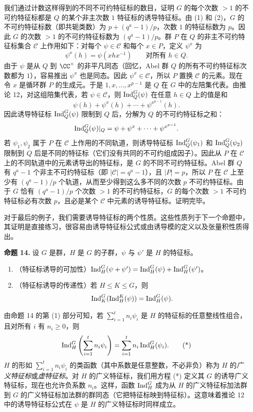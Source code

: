 我们通过计数这样得到的不同不可约特征标的数目，证明 $G$ 的每个次数 $>1$ 的不可约特征标都是 $Q$ 的某个非主次数 $1$ 特征标的诱导特征标。由 (1) 和 (2)，$G$ 的不可约特征标数（即共轭类数）为 $p+(q^a-1)/p$，次数 $1$ 的特征标数为 $p$。因此 $G$ 的次数 $>1$ 的不可约特征标数为 $(q^a-1)/p$。群 $P$ 在 $Q$ 的非主不可约特征标集合 $\mathcal C$ 上作用如下：对每个 $\psi\in\mathcal C$ 和每个 $x\in P$，定义 $\psi^x$ 为
\[
  \psi^x(h)=\psi(xhx^{-1})\qquad\text{对所有 }h\in Q.
\]
由于 $\psi$ 是从 $Q$ 到 $\CC^\times$ 的非平凡同态（回忆，Abel 群 $Q$ 的所有不可约特征标次数都为 $1$），容易推出 $\psi^x$ 也是同态。因此 $\psi^x\in\mathcal C$，所以 $P$ 置换 $\mathcal C$ 的元素。现在令 $x$ 是循环群 $P$ 的生成元。于是 $1,x,\ldots,x^{p-1}$ 是 $Q$ 在 $G$ 中的左陪集代表。由推论 12，对这组陪集代表，若 $\psi\in\mathcal C$，则 $\operatorname{Ind}_Q^G(\psi)$ 在任意 $h\in Q$ 上的值是和
\[
  \psi(h)+\psi^x(h)+\cdots+\psi^{x^{p-1}}(h).
\]
因此诱导特征标 $\operatorname{Ind}_Q^G(\psi)$ 限制到 $Q$ 后，分解为 $Q$ 的不可约特征标之和：
\[
  \operatorname{Ind}_Q^G(\psi)|_Q=\psi+\psi^x+\cdots+\psi^{x^{p-1}}.
\]
若 $\psi_1,\psi_2$ 属于 $P$ 在 $\mathcal C$ 上作用的不同轨道，则诱导特征标 $\operatorname{Ind}_Q^G(\psi_1)$ 和 $\operatorname{Ind}_Q^G(\psi_2)$ 限制到 $Q$ 后是不同的特征标（它们没有共同的不可约组成因子）。因此从 $P$ 在 $\mathcal C$ 上的不同轨道中的元素诱导出的特征标，是 $G$ 的不同不可约特征标。Abel 群 $Q$ 有 $q^a-1$ 个非主不可约特征标（即 $|\mathcal C|=q^a-1$），且 $|P|=p$，所以 $P$ 在 $\mathcal C$ 上至少有 $(q^a-1)/p$ 个轨道，从而至少得到这么多不同的次数 $p$ 不可约特征标。由于 $G$ 恰有 $(q^a-1)/p$ 个次数 $>1$ 的不可约特征标，$G$ 的每个次数 $>1$ 不可约特征标必有次数 $p$，且必是某个 $\mathcal C$ 中元素的诱导特征标。证明完毕。

对于最后的例子，我们需要诱导特征标的两个性质。这些性质列于下一个命题中，其证明是直接练习，很容易由诱导特征标公式或由诱导模的定义以及张量积性质得出。

\noindent\textbf{命题 14.} 设 $G$ 是群，$H$ 是 $G$ 的子群，$\psi$ 与 $\psi'$ 是 $H$ 的特征标。
\begin{enumerate}[label=(\arabic*)]
  \item （特征标诱导的可加性）$\operatorname{Ind}_H^G(\psi+\psi')=\operatorname{Ind}_H^G(\psi)+\operatorname{Ind}_H^G(\psi')$。
  \item （特征标诱导的传递性）若 $H\leq K\leq G$，则
  \[
    \operatorname{Ind}_K^G(\operatorname{Ind}_H^K(\psi))=\operatorname{Ind}_H^G(\psi).
  \]
\end{enumerate}

由命题 14 的第 (1) 部分可知，若 $\sum_{i=1}^t n_i\psi_i$ 是 $H$ 的特征标的任意整线性组合，且对所有 $i$ 有 $n_i\geq0$，则
\[
  \operatorname{Ind}_H^G\left(\sum_{i=1}^t n_i\psi_i\right)
  =\sum_{i=1}^t n_i\operatorname{Ind}_H^G(\psi_i). \tag{*}
\]
$H$ 的形如 $\sum_{i=1}^t n_i\psi_i$ 的类函数（其中系数是任意整数，不必非负）称为 $H$ 的\emph{广义特征标}或\emph{虚特征标}。对 $H$ 的广义特征标，我们用方程 (*) 定义其 $G$ 的诱导广义特征标，现在也允许负系数 $n_i$。这样，函数 $\operatorname{Ind}_H^G$ 成为从 $H$ 的广义特征标加法群到 $G$ 的广义特征标加法群的群同态（它把特征标映到特征标）。这意味着推论 12 中的诱导特征标公式在 $\psi$ 是 $H$ 的广义特征标时同样成立。


